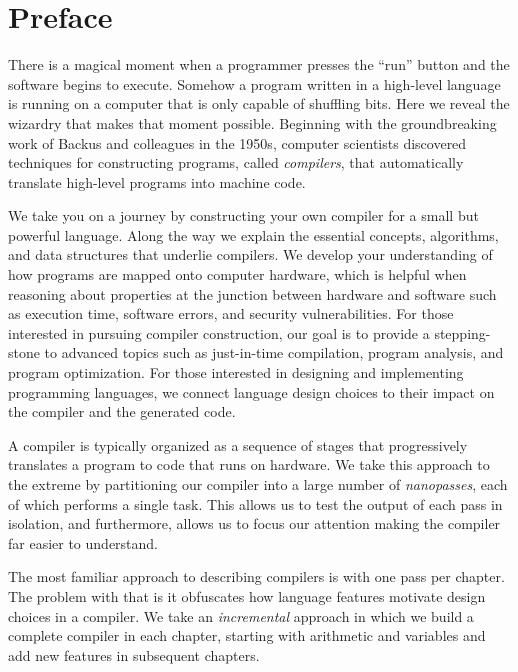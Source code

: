\documentclass[7x10]{TimesAPriori_MIT}%
\begin{document}
\listoftables


\chapter*{Preface}

There is a magical moment when a programmer presses the ``run'' button
and the software begins to execute. Somehow a program written in a
high-level language is running on a computer that is only capable of
shuffling bits. Here we reveal the wizardry that makes that moment
possible. Beginning with the groundbreaking work of Backus and
colleagues in the 1950s, computer scientists discovered techniques for
constructing programs, called \emph{compilers}, that automatically
translate high-level programs into machine code.

We take you on a journey by constructing your own compiler for a small
but powerful language. Along the way we explain the essential
concepts, algorithms, and data structures that underlie compilers. We
develop your understanding of how programs are mapped onto computer
hardware, which is helpful when reasoning about properties at the
junction between hardware and software such as execution time,
software errors, and security vulnerabilities.  For those interested
in pursuing compiler construction, our goal is to provide a
stepping-stone to advanced topics such as just-in-time compilation,
program analysis, and program optimization.  For those interested in
designing and implementing programming languages, we connect
language design choices to their impact on the compiler and the generated
code.

A compiler is typically organized as a sequence of stages that
progressively translates a program to code that runs on hardware. We
take this approach to the extreme by partitioning our compiler into a
large number of \emph{nanopasses}, each of which performs a single
task. This allows us to test the output of each pass in isolation, and
furthermore, allows us to focus our attention making the compiler far
easier to understand.


The most familiar approach to describing compilers is with one pass
per chapter.  The problem with that is it obfuscates how language
features motivate design choices in a compiler. We take an
\emph{incremental} approach in which we build a complete compiler in
each chapter, starting with arithmetic and variables and add new
features in subsequent chapters.
\end{document}
